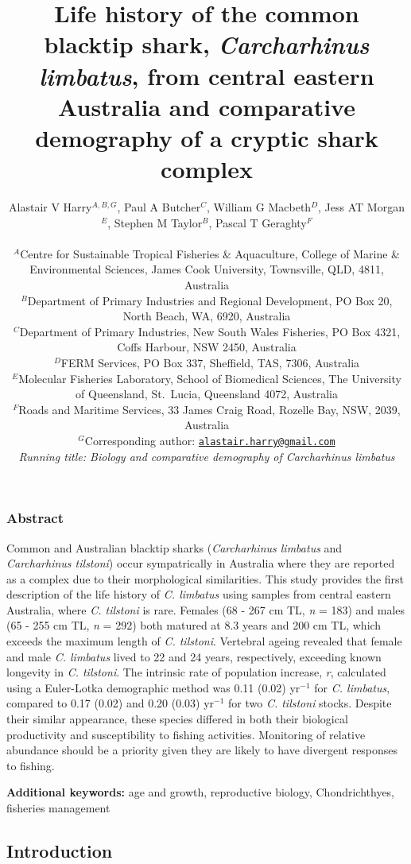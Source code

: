 \documentclass[]{article}
\title{Life history of the common blacktip shark, \emph{Carcharhinus limbatus},
from central eastern Australia and comparative demography of a cryptic
shark complex}
\author{Alastair V Harry\(^{A,B,G}\), Paul A Butcher\(^C\), William G
Macbeth\(^D\), Jess AT Morgan\(^E\), Stephen M Taylor\(^B\), Pascal T
Geraghty\(^F\)\\
~\\
\(^A\)Centre for Sustainable Tropical Fisheries \& Aquaculture, College
of Marine \& Environmental Sciences, James Cook University, Townsville,
QLD, 4811, Australia\\
\(^B\)Department of Primary Industries and Regional Development, PO Box
20, North Beach, WA, 6920, Australia\\
\(^C\)Department of Primary Industries, New South Wales Fisheries, PO
Box 4321, Coffs Harbour, NSW 2450, Australia\\
\(^D\)FERM Services, PO Box 337, Sheffield, TAS, 7306, Australia\\
\(^E\)Molecular Fisheries Laboratory, School of Biomedical Sciences, The
University of Queensland, St.~Lucia, Queensland 4072, Australia\\
\(^F\)Roads and Maritime Services, 33 James Craig Road, Rozelle Bay,
NSW, 2039, Australia\\
\(^G\)Corresponding author:
\href{mailto:alastair.harry@gmail.com}{\nolinkurl{alastair.harry@gmail.com}}\\
\emph{Running title: Biology and comparative demography of Carcharhinus
limbatus}}
\date{}
\begin{document}
\maketitle

\newpage

\hypertarget{abstract}{%
\subsubsection{Abstract}\label{abstract}}

Common and Australian blacktip sharks (\emph{Carcharhinus limbatus} and
\emph{Carcharhinus tilstoni}) occur sympatrically in Australia where
they are reported as a complex due to their morphological similarities.
This study provides the first description of the life history of
\emph{C. limbatus} using samples from central eastern Australia, where
\emph{C. tilstoni} is rare. Females (68 - 267 cm TL, \emph{n} = 183) and
males (65 - 255 cm TL, \emph{n} = 292) both matured at 8.3 years and 200
cm TL, which exceeds the maximum length of \emph{C. tilstoni}. Vertebral
ageing revealed that female and male \emph{C. limbatus} lived to 22 and
24 years, respectively, exceeding known longevity in \emph{C. tilstoni}.
The intrinsic rate of population increase, \emph{r}, calculated using a
Euler-Lotka demographic method was 0.11 (0.02) yr\(^{-1}\) for \emph{C.
limbatus}, compared to 0.17 (0.02) and 0.20 (0.03) yr\(^{-1}\) for two
\emph{C. tilstoni} stocks. Despite their similar appearance, these
species differed in both their biological productivity and
susceptibility to fishing activities. Monitoring of relative abundance
should be a priority given they are likely to have divergent responses
to fishing.

\textbf{Additional keywords:} age and growth, reproductive biology,
Chondrichthyes, fisheries management

\newpage

\hypertarget{introduction}{%
\subsection{Introduction}\label{introduction}}
\end{document}
